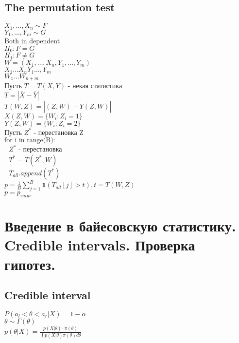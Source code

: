 \documentclass{article}
\newcommand\0{\mathbb{0}}
\newcommand\1{\mathbb{1}}
\begin{document}
\subsection{The permutation test}
$X_1, \dots, X_n \sim F$\\
$Y_1, \dots, Y_m \sim G$\\
Both in dependent\\
$H_0: F = G$\\
$H_1: F \neq G$\\
$W = (X_1, \dots, X_n, Y_1, \dots, Y_m)$\\
$X_1 \dots X_n Y_1 \dots, Y_m$\\
$W_1\dots W_{n + m}$\\
Пусть $T = T(X, Y)$ - некая статистика\\
$T = |\overline{X} - \overline{Y}|$\\
$T(W, Z) = |\overline{(Z, W)} - \overline{Y(Z, W)}|$\\
$X(Z, W) = \{W_i : Z_i = 1\}$\\
$Y(Z, W) = \{W_i : Z_i = 2\}$\\
Пусть $Z^*$ - перестановка Z\\
$\text{for i in range(B):}$\\
$\text{    }Z^*$ - перестановка\\
$\text{    }T^* = T(Z^*, W)$\\
$\text{    }T_{all}.append(T^*)$\\
$p = \frac{1}{B}\displaystyle\sum_{j = 1}^B \mathbb{1}(T_{all}[j] > t), t = T(W, Z)$\\
$p = p_{value}$\\
\section{Введение в байесовскую статистику. Credible intervals. Проверка гипотез.}
\subsection{Credible interval}
$P(a_l < \theta < a_r | X) = 1 - \alpha$\\
$\theta \sim \Gamma(\theta)$\\
$p(\theta | X) = \frac{p(X | \theta) \cdot \pi(\theta)}{\displaystyle\int p(X | \theta) \pi(\theta) d\theta}$\\
\end{document}
